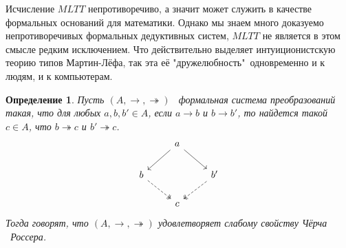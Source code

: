 \documentclass{article}[12pt]
\newtheorem{definition}{Определение}
\newcommand{\dash}{\textemdash\ }
\begin{document}
Исчисление $MLTT$ непротиворечиво, а значит может служить в качестве формальных оснований для
математики. Однако мы знаем много доказуемо непротиворечивых формальных дедуктивных систем, $MLTT$
не является в этом смысле редким исключением. Что действительно выделяет интуиционистскую теорию типов
Мартин-Лёфа, так эта её "дружелюбность"\ одновременно и к людям, и к компьютерам.

\begin{definition}
    Пусть $(A, \rightarrow, \twoheadrightarrow)$ \dash формальная система преобразований такая, что
    для любых $a, b, b' \in A$, если $a \rightarrow b$ и $b \rightarrow b'$, то найдется такой $c \in A$,
    что $b \twoheadrightarrow c$ и $b' \twoheadrightarrow c$.
    $$
    \begin{tikzcd}
        & \arrow[ld] a \arrow[rd] & \\
        b \arrow[rd, two heads, dashed] & & \arrow[ld, two heads, dashed] b' \\
        & c &
    \end{tikzcd}
    $$
    Тогда говорят, что $(A, \rightarrow, \twoheadrightarrow)$ удовлетворяет слабому свойству Чёрча \dash Россера.
\end{definition}
\end{document}
